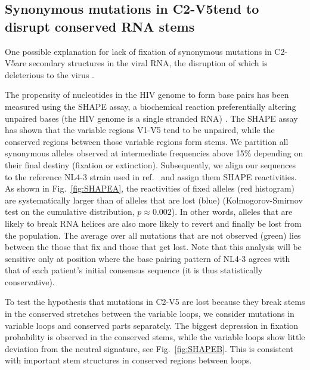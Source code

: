 \documentclass[rmp, twocolumn]{revtex4}
\newcommand{\FIG}[1]{Fig.~\ref{fig:#1}}
\newcommand{\shankaregion}{C2-V5}
\begin{document}
\subsection{Synonymous mutations in \shankaregion tend to disrupt conserved RNA stems}
One possible explanation for lack of fixation of synonymous mutations in
\shankaregion are secondary structures in the viral RNA, the disruption of which
is deleterious to the virus \citep{forsdyke_reciprocal_1995,
snoeck_mapping_2011, sanjuan_interplay_2011}.

The propensity of nucleotides in the HIV genome to form base pairs has been
measured using the SHAPE assay, a biochemical reaction preferentially altering
unpaired bases (the HIV genome is a single stranded RNA)
\citep{watts_architecture_2009}. The SHAPE assay has shown that the variable
regions V1-V5 tend to be unpaired, while the conserved regions between those
variable regions form stems. We partition all synonymous alleles observed at
intermediate frequencies above 15\% depending on their final destiny (fixation
or extinction). Subsequently, we align our sequences to the reference NL4-3
strain used in ref.~\citep{watts_architecture_2009} and assign them SHAPE
reactivities. As shown in \FIG{SHAPEA}, the reactivities of fixed alleles (red
histogram) are systematically larger than of alleles that are lost (blue)
(Kolmogorov-Smirnov test on the cumulative distribution, $p\approx 0.002$). In
other words, alleles that are likely to break RNA helices are also more likely
to revert and finally be lost from the population. The average over all
mutations that are not observed (green) lies between the those that fix and
those that get lost. Note that this analysis will be sensitive only at position
where the base pairing pattern of NL4-3 agrees with that of each patient's
initial consensus sequence (it is thus statistically conservative).

To test the hypothesis that mutations in \shankaregion{} are lost because they
break stems in the conserved stretches between the variable loops, we consider
mutations in variable loops and conserved parts separately. The biggest
depression in fixation probability is observed in the conserved stems, while the
variable loops show little deviation from the neutral signature, see
\FIG{SHAPEB}. This is consistent with important stem structures in conserved
regions between loops.
\end{document}
